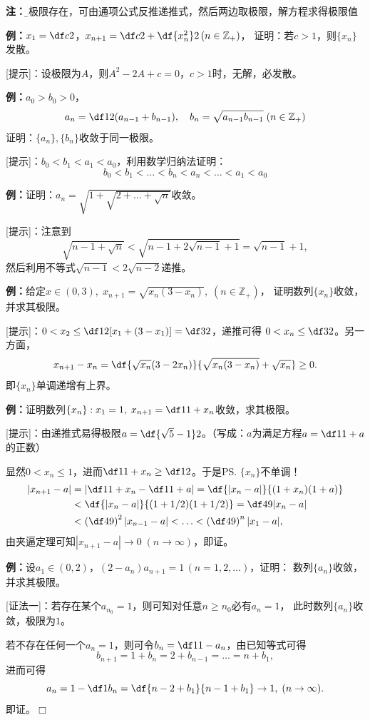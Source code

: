 {\bf 注：}{\b 若极限存在，可由通项公式反推递推式，然后两边取极限，解方程求得极限值}

{\bf 例：}$x_1=\df c2$，$x_{n+1}=\df c2+\df{x_n^2}2\,(n\in\mathbb{Z}_+)$，
证明：若$c>1$，则$\{x_n\}$发散。

[提示]：设极限为$A$，则$A^2-2A+c=0$，$c>1$时，无解，必发散。

{\bf 例：}$a_0>b_0>0$，
$$a_n=\df12(a_{n-1}+b_{n-1}),\quad
b_n=\sqrt{a_{n-1}b_{n-1}}\;(n\in\mathbb{Z}_+)$$
证明：$\{a_n\},\{b_n\}$收敛于同一极限。

[提示]：$b_0<b_1<a_1<a_0$，利用数学归纳法证明：
$$b_0<b_1<\ldots<b_n<a_n<\ldots<a_1<a_0$$

{\bf 例：}证明：$a_n=\sqrt{1+\sqrt{2+\ldots+\sqrt{n}}}$收敛。

[提示]：注意到
$$\sqrt{n-1+\sqrt n}<\sqrt{n-1+2\sqrt{n-1}+1}=\sqrt{n-1}+1,$$
然后利用不等式$\sqrt{n-1}<2\sqrt{n-2}$递推。

{\bf 例：}给定$x\in(0,3),\; x_{n+1}=\sqrt{x_n(3-x_n)},\;(n\in\mathbb{Z}_+)$，
证明数列$\{x_n\}$收敛，并求其极限。

[提示]：$0<x_2\leq\df12[x_1+(3-x_1)]=\df32$，递推可得
$0<x_n\leq\df32$。另一方面，
$$x_{n+1}-x_n=\df{\sqrt{x_n}(3-2x_n)}{\sqrt{x_n(3-x_n)}+\sqrt{x_n}}\geq 0.$$
即$\{x_n\}$单调递增有上界。

{\bf 例：}证明数列$\{x_n\}:x_1=1,\;x_{n+1}=\df1{1+x_n}$收敛，求其极限。

[提示]：由递推式易得极限$a=\df{\sqrt5-1}2$。（写成：$a$为满足方程$a=\df1{1+a}$的正数）

显然$0<x_n\leq1$，进而$\df1{1+x_n}\geq\df12$。于是\ps{$\{x_n\}$不单调！}
\begin{align}
	|x_{n+1}-a|&=\left|\df1{1+x_n}-\df1{1+a}\right|=\df{|x_n-a|}{(1+x_n)(1+a)}\notag\\
	&<\df{|x_n-a|}{(1+1/2)(1+1/2)}=\df49|x_n-a|\notag\\
	&<\left(\df49\right)^2|x_{n-1}-a|<\ldots<\left(\df49\right)^{n}|x_1-a|,\notag
\end{align}
由夹逼定理可知$|x_{n+1}-a|\to0\;(n\to\infty)$，即证。

{\bf 例：}设$a_1\in(0,2)$，$(2-a_n)a_{n+1}=1\,(n=1,2,\ldots)$，证明：
数列$\{a_n\}$收敛，并求其极限。

[证法一]：若存在某个$a_{n_0}=1$，则可知对任意$n\geq n_0$必有$a_n=1$，
此时数列$\{a_n\}$收敛，极限为$1$。

若不存在任何一个$a_n=1$，则可令$b_n=\df1{1-a_n}$，由已知等式可得
$$b_{n+1}=1+b_n=2+b_{n-1}=\ldots=n+b_1,$$
进而可得
$$a_n=1-\df1{b_n}=\df{n-2+b_1}{n-1+b_1}\to 1,\;(n\to\infty).$$
即证。\hfill$\Box$

